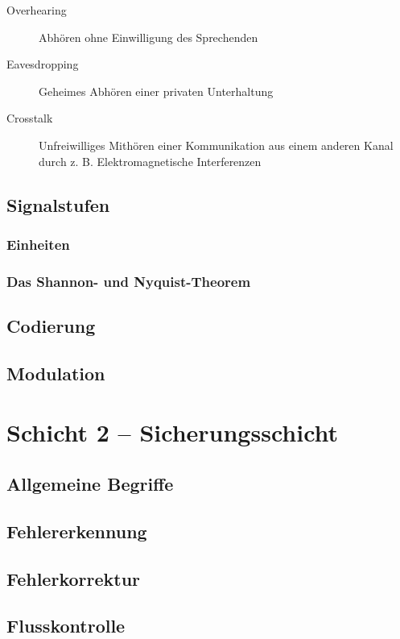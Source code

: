 \documentclass[a4paper,10pt]{scrartcl}
\begin{document}
\begin{description}
\item[Overhearing] Abhören ohne Einwilligung des Sprechenden 
\item[Eavesdropping] Geheimes Abhören einer privaten Unterhaltung
\item[Crosstalk] Unfreiwilliges Mithören einer Kommunikation aus einem anderen Kanal durch z. B. Elektromagnetische Interferenzen
\end{description}

\subsection{Signalstufen}
\subsubsection{Einheiten}
\subsubsection{Das Shannon- und Nyquist-Theorem}
\subsection{Codierung}
\subsection{Modulation}

\section{Schicht 2 -- Sicherungsschicht}
\subsection{Allgemeine Begriffe}
\subsection{Fehlererkennung}
\subsection{Fehlerkorrektur}
\subsection{Flusskontrolle}
\end{document}
